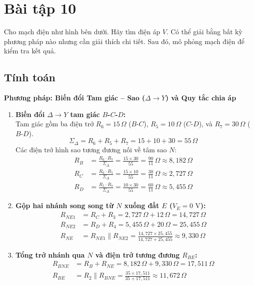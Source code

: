 \section{Bài tập 10}

Cho mạch điện như hình bên dưới. Hãy tìm điện áp $V$. Có thể giải bằng bất kỳ phương pháp nào nhưng cần giải thích chi tiết. Sau đó, mô phỏng mạch điện để kiểm tra kết quả.


\subsection{Tính toán}
\noindent\textbf{Phương pháp: Biến đổi Tam giác -- Sao ($\Delta \to Y$) và Quy tắc chia áp}
\begin{enumerate}[leftmargin=2em]
  \item \textbf{Biến đổi $\Delta \to Y$ tam giác $B$-$C$-$D$:} \\
        Tam giác gồm ba điện trở $R_6 = 15\,\Omega$ ($B$-$C$), $R_5 = 10\,\Omega$ ($C$-$D$), và $R_7 = 30\,\Omega$ ($B$-$D$).
        \[
        \Sigma_\Delta = R_6 + R_5 + R_7 = 15 + 10 + 30 = 55\,\Omega
        \]
        Các điện trở hình sao tương đương nối về tâm sao $N$:
        \begin{align*}
        R_B &= \frac{R_6 \cdot R_7}{\Sigma_\Delta} = \frac{15 \times 30}{55} = \frac{90}{11}\,\Omega \approx 8{,}182\,\Omega \\
        R_C &= \frac{R_6 \cdot R_5}{\Sigma_\Delta} = \frac{15 \times 10}{55} = \frac{30}{11}\,\Omega \approx 2{,}727\,\Omega \\
        R_D &= \frac{R_5 \cdot R_7}{\Sigma_\Delta} = \frac{10 \times 30}{55} = \frac{60}{11}\,\Omega \approx 5{,}455\,\Omega
        \end{align*}

  \item \textbf{Gộp hai nhánh song song từ $N$ xuống đất $E$ ($V_E = 0\text{ V}$):}
        \begin{align*}
        R_{NE1} &= R_C + R_3 = 2{,}727\,\Omega + 12\,\Omega = 14{,}727\,\Omega \\
        R_{NE2} &= R_D + R_4 = 5{,}455\,\Omega + 20\,\Omega = 25{,}455\,\Omega \\
        R_{NE} &= R_{NE1} \parallel R_{NE2} = \frac{14{,}727 \times 25{,}455}{14{,}727 + 25{,}455} \approx 9{,}330\,\Omega
        \end{align*}

  \item \textbf{Tổng trở nhánh qua $N$ và điện trở tương đương $R_{BE}$:}
        \begin{align*}
        R_{BNE} &= R_B + R_{NE} = 8{,}182\,\Omega + 9{,}330\,\Omega = 17{,}511\,\Omega \\
        R_{BE} &= R_2 \parallel R_{BNE} = \frac{35 \times 17{,}511}{35 + 17{,}511} \approx 11{,}672\,\Omega
        \end{align*}


\end{enumerate}
